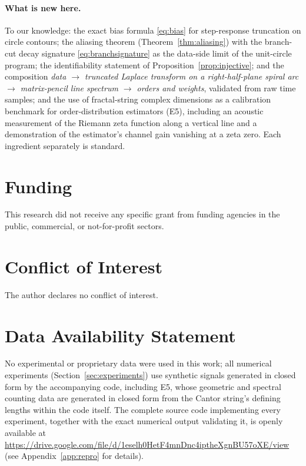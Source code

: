 \documentclass[11pt, a4paper]{article}
\theoremstyle{definition}
\theoremstyle{remark}
\begin{document}
\paragraph{What is new here.} To our knowledge: the exact bias formula
\eqref{eq:bias} for step-response truncation on circle contours; the
aliasing theorem (Theorem~\ref{thm:aliasing}) with the branch-cut decay
signature \eqref{eq:branchsignature} as the data-side limit of the
unit-circle program; the identifiability statement of
Proposition~\ref{prop:injective}; and the composition
\emph{data $\to$ truncated Laplace transform on a right-half-plane spiral
arc $\to$ matrix-pencil line spectrum $\to$ orders and weights}, validated
from raw time samples; and the use of fractal-string complex dimensions as
a calibration benchmark for order-distribution estimators (E5), including
an acoustic measurement of the Riemann zeta function along a vertical
line and a demonstration of the estimator's channel gain vanishing at a
zeta zero. Each ingredient separately is standard.

\section*{Funding}

This research did not receive any specific grant from funding agencies in
the public, commercial, or not-for-profit sectors.

\section*{Conflict of Interest}

The author declares no conflict of interest.

\section*{Data Availability Statement}

\begin{sloppypar}
No experimental or proprietary data were used in this work; all numerical
experiments (Section~\ref{sec:experiments}) use synthetic signals generated
in closed form by the accompanying code, including E5, whose geometric and
spectral counting data are generated in closed form from the Cantor
string's defining lengths within the code itself. The complete source code
implementing every experiment, together with the exact numerical output
validating it, is openly available at
\url{https://drive.google.com/file/d/1eselh0HetF4mnDnc4iptheXgnBU57oXE/view}
(see Appendix~\ref{app:repro} for details).
\end{sloppypar}
\end{document}
